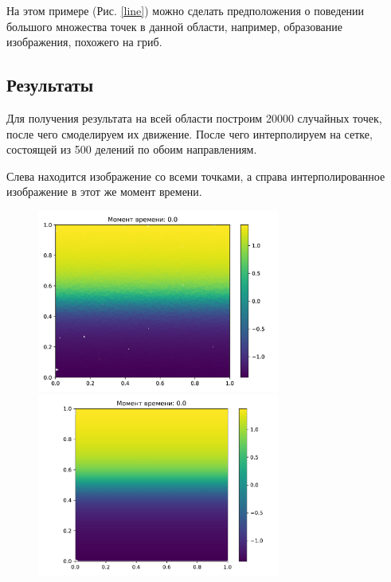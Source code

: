         На этом примере (Рис. \ref{line}) можно сделать предположения о поведении большого множества точек в данной области, например, образование изображения, похожего на гриб.


    \subsection{Результаты}
        Для получения результата на всей области построим 20000 случайных точек, после чего смоделируем их движение. После чего интерполируем на сетке, состоящей из 500 делений по обоим направлениям.

        Слева находится изображение со всеми точками, а справа интерполированное изображение в этот же момент времени.

    \begin{figure}[H]
        \centering
        \includegraphics[width=8cm]{pictures/s0.png}
        \includegraphics[width=8cm]{pictures/p0.pdf}
    \end{figure}
